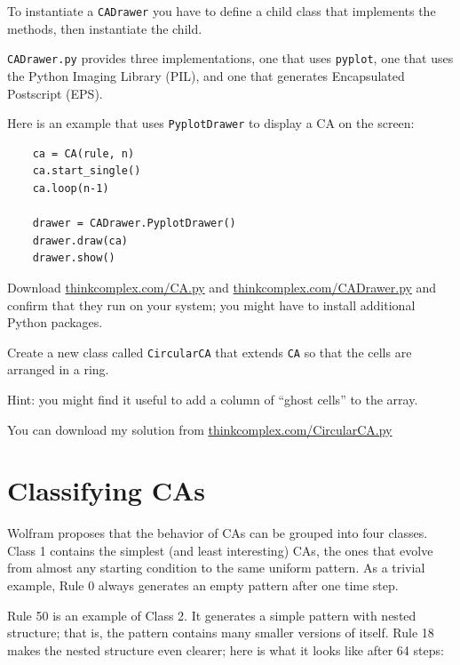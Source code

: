 \documentclass[10pt]{book}
\begin{document}
To instantiate a {\tt CADrawer} you have to define a child class
that implements the methods, then instantiate the child.

{\tt CADrawer.py} provides three implementations, one that uses
{\tt pyplot}, one that uses the Python Imaging Library (PIL), and
one that generates Encapsulated Postscript (EPS).

Here is an example that uses {\tt PyplotDrawer} to display a
CA on the screen:

\begin{verbatim}
    ca = CA(rule, n)
    ca.start_single()
    ca.loop(n-1)

    drawer = CADrawer.PyplotDrawer()
    drawer.draw(ca)
    drawer.show()
\end{verbatim}

\begin{exercise}

Download \url{thinkcomplex.com/CA.py} and \url{thinkcomplex.com/CADrawer.py}
and confirm that they run on your system; you might have to install
additional Python packages.

Create a new class called {\tt CircularCA} that extends
{\tt CA} so that the cells are arranged in a ring.

Hint: you might find it useful to add a column of ``ghost cells'' to
the array.

You can download my solution from
\url{thinkcomplex.com/CircularCA.py}

\end{exercise}


\section{Classifying CAs}

Wolfram proposes that the behavior of CAs can be grouped
into four classes.  Class 1 contains the simplest (and least
interesting) CAs, the ones that evolve from almost any starting
condition to the same uniform pattern.  As a trivial example,
Rule 0 always generates an empty pattern after one time step.

Rule 50 is an example of Class 2.  It generates a simple pattern with
nested structure; that is, the pattern contains many smaller versions
of itself.  Rule 18 makes the nested structure even clearer; here is
what it looks like after 64 steps:
\end{document}
